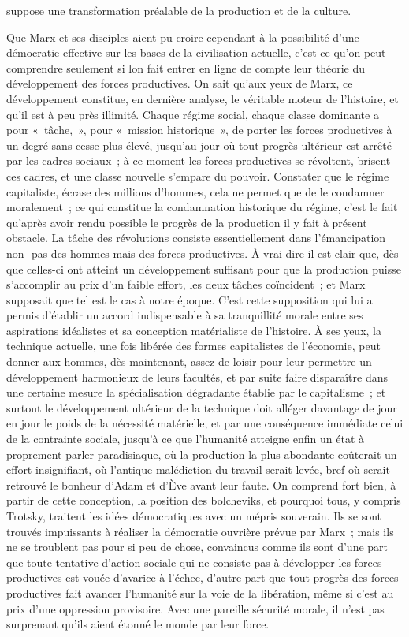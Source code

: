 \documentclass[french,twoside]{book} %
\begin{document}
suppose une transformation préalable de la production et de la culture.\par
Que Marx et ses disciples aient pu croire cependant à la possibilité d'une démocratie effective sur les bases de la civilisation actuelle, c'est ce qu'on peut comprendre seulement si lon fait entrer en ligne de compte leur théorie du développement des forces productives. On sait qu'aux yeux de Marx, ce développement constitue, en dernière analyse, le véritable moteur de l'histoire, et qu'il est à peu près illimité. Chaque régime social, chaque classe dominante a pour « tâche, », pour « mission historique », de porter les forces productives à un degré sans cesse plus élevé, jusqu'au jour où tout progrès ultérieur est arrêté par les cadres sociaux ; à ce moment les forces productives se révoltent, brisent ces cadres, et une classe nouvelle s'empare du pouvoir. Constater que le régime capitaliste, écrase des millions d'hommes, cela ne permet que de le condamner moralement ; ce qui constitue la condamnation historique du régime, c'est le fait qu'après avoir rendu possible le progrès de la production il y fait à présent obstacle. La tâche des révolutions consiste essentiellement dans l'émancipation non -pas des hommes mais des forces productives. À vrai dire il est clair que, dès que celles-ci ont atteint un développement suffisant pour que la production puisse s'accomplir au prix d'un faible effort, les deux tâches coïncident ; et Marx supposait que tel est le cas à notre époque. C'est cette supposition qui lui a permis d'établir un accord indispensable à sa tranquillité morale entre ses aspirations idéalistes et sa conception matérialiste de l'histoire. À ses yeux, la technique actuelle, une fois libérée des formes capitalistes de l'économie, peut donner aux hommes, dès maintenant, assez de loisir pour leur permettre un développement harmonieux de leurs facultés, et par suite faire disparaître dans une certaine mesure la spécialisation dégradante établie par le capitalisme ; et surtout le développement ultérieur de la technique doit alléger davantage de jour en jour le poids de la nécessité matérielle, et par une conséquence immédiate celui de la contrainte sociale, jusqu'à ce que l'humanité atteigne enfin un état à proprement parler paradisiaque, où la production la plus abondante coûterait un effort insignifiant, où l'antique malédiction du travail serait levée, bref où serait retrouvé le bonheur d'Adam et d'Ève avant leur faute. On comprend fort bien, à partir de cette conception, la position des bolcheviks, et pourquoi tous, y compris Trotsky, traitent les idées démocratiques avec un mépris souverain. Ils se sont trouvés impuissants à réaliser la démocratie ouvrière prévue par Marx ; mais ils ne se troublent pas pour si peu de chose, convaincus comme ils sont d'une part que toute tentative d'action sociale qui ne consiste pas à développer les forces productives est vouée d'avarice à l’échec, d'autre part que tout progrès des forces productives fait avancer l'humanité sur la voie de la libération, même si c'est au prix d'une oppression provisoire. Avec une pareille sécurité morale, il n'est pas surprenant qu'ils aient étonné le monde par leur force.\par
\end{document}
